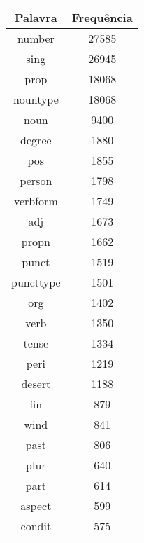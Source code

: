 \begin{tabular}{| c c |}
\hline 

Palavra & Frequ{\^e}ncia \\ \hline 

number & 27585 \\ 

sing & 26945 \\ 

prop & 18068 \\ 

nountype & 18068 \\ 

noun & 9400 \\ 

degree & 1880 \\ 

pos & 1855 \\ 

person & 1798 \\ 

verbform & 1749 \\ 

adj & 1673 \\ 

propn & 1662 \\ 

punct & 1519 \\ 

puncttype & 1501 \\ 

org & 1402 \\ 

verb & 1350 \\ 

tense & 1334 \\ 

peri & 1219 \\ 

desert & 1188 \\ 

fin & 879 \\ 

wind & 841 \\ 

past & 806 \\ 

plur & 640 \\ 

part & 614 \\ 

aspect & 599 \\ 

condit & 575 \\ 
\hline 
\end{tabular}
